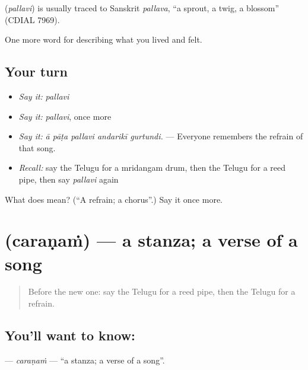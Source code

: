 \begin{cousinweb}
\textbf{} (\emph{pallavi}) is usually traced to Sanskrit \emph{pallava}, \textquotedblleft{}a sprout, a twig, a blossom\textquotedblright{} (CDIAL 7969).
\end{cousinweb}

\begin{grammarlens}[title={What you've built}]
One more word for describing what you lived and felt.
\end{grammarlens}

\subsection*{Your turn}
\begin{itemize}
\raggedright
  \item \emph{Say it:} \emph{pallavi}
  \item \emph{Say it:} \emph{pallavi}, once more
  \item \emph{Say it:} \emph{ā pāṭa pallavi andarikī gurtundi.} — Everyone remembers the refrain of that song.
  \item \emph{Recall:} say the Telugu for a mridangam drum, then the Telugu for a reed pipe, then say \emph{pallavi} again
\end{itemize}

\begin{tcolorbox}[breakable,colback=teal!4,colframe=teal!35!black,title={Before you move on}]
What does  mean? (\textquotedblleft{}A refrain; a chorus\textquotedblright{}.) Say it once more.
\end{tcolorbox}
\section[\texorpdfstring{\te{చరణం} (caraṇaṁ)}{చరణం (caraṇaṁ)}]{ (caraṇaṁ) — a stanza; a verse of a song}

\label{lesson:TE-C539-caranam}



\begin{quote}
Before the new one: say the Telugu for a reed pipe, then the Telugu for a refrain.
\end{quote}

\subsection*{You'll want to know: }
\textbf{} — \emph{caraṇaṁ} — \textquotedblleft{}a stanza; a verse of a song\textquotedblright{}.

